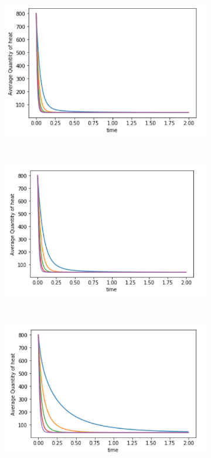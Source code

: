 \documentclass[10pt,a4paper]{article}
\begin{document}
\begin{figure}[!h]
	\centering
	\begin{subfigure}[b]{0.45\textwidth}
		\includegraphics[width= \textwidth]{images/Barabasi-highest-degree.png}
		\caption{}
		\label{}
	\end{subfigure}~
	\begin{subfigure}[b]{0.45\textwidth}
		\includegraphics[width= \textwidth]{images/E-R-largest.png}
		\caption{}
		\label{}
	\end{subfigure}\\
    \begin{subfigure}[b]{0.45\textwidth}
    	\includegraphics[width= \textwidth]{images/barabasi-random-selection.png}

\end{subfigure}
\end{figure}
\end{document}
